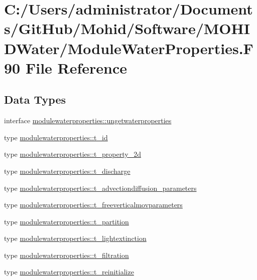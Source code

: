 \hypertarget{_module_water_properties_8_f90}{}\section{C\+:/\+Users/administrator/\+Documents/\+Git\+Hub/\+Mohid/\+Software/\+M\+O\+H\+I\+D\+Water/\+Module\+Water\+Properties.F90 File Reference}
\label{_module_water_properties_8_f90}
\subsection*{Data Types}
\begin{DoxyCompactItemize}
\item 
interface \mbox{\hyperlink{interfacemodulewaterproperties_1_1ungetwaterproperties}{modulewaterproperties\+::ungetwaterproperties}}
\item 
type \mbox{\hyperlink{structmodulewaterproperties_1_1t__id}{modulewaterproperties\+::t\+\_\+id}}
\item 
type \mbox{\hyperlink{structmodulewaterproperties_1_1t__property__2d}{modulewaterproperties\+::t\+\_\+property\+\_\+2d}}
\item 
type \mbox{\hyperlink{structmodulewaterproperties_1_1t__discharge}{modulewaterproperties\+::t\+\_\+discharge}}
\item 
type \mbox{\hyperlink{structmodulewaterproperties_1_1t__advectiondiffusion__parameters}{modulewaterproperties\+::t\+\_\+advectiondiffusion\+\_\+parameters}}
\item 
type \mbox{\hyperlink{structmodulewaterproperties_1_1t__freeverticalmovparameters}{modulewaterproperties\+::t\+\_\+freeverticalmovparameters}}
\item 
type \mbox{\hyperlink{structmodulewaterproperties_1_1t__partition}{modulewaterproperties\+::t\+\_\+partition}}
\item 
type \mbox{\hyperlink{structmodulewaterproperties_1_1t__lightextinction}{modulewaterproperties\+::t\+\_\+lightextinction}}
\item 
type \mbox{\hyperlink{structmodulewaterproperties_1_1t__filtration}{modulewaterproperties\+::t\+\_\+filtration}}
\item 
type \mbox{\hyperlink{structmodulewaterproperties_1_1t__reinitialize}{modulewaterproperties\+::t\+\_\+reinitialize}}

\end{DoxyCompactItemize}
